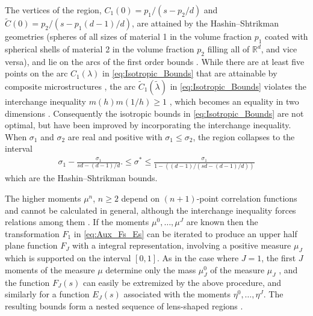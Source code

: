 \documentclass[11pt]{amsart}
\begin{document}
The vertices of the region,
$C_1(0)=p_1/(s-p_2/d)$ and $\tilde{C}(0)=p_2/(s-p_1(d-1)/d)$, are
attained by the Hashin--Shtrikman geometries (spheres of all
sizes of material 1 in the volume fraction $p_1$ coated with spherical
shells of material 2 in the volume fraction $p_2$ filling all of
$\mathbb{R}^d$, and vice versa), and lie on the arcs of the first
order bounds \cite{Golden:1986:BCP}. While there are at least five
points on the arc $C_1(\lambda)$ in \eqref{eq:Isotropic_Bounds} that are
attainable by composite microstructures \cite{Milton:JAP-5286}, the
arc $\tilde{C}_1(\tilde{\lambda})$ in \eqref{eq:Isotropic_Bounds} violates
\cite{Golden:1986:BCP} the interchange inequality $m(h)m(1/h)\geq1$
\cite{Keller:1964:TCC,Schulgasser:1976:CFR}, which becomes an equality
in two dimensions \cite{MILTON:2002:TC}.  Consequently the isotropic
bounds in \eqref{eq:Isotropic_Bounds} are not optimal, but have been
improved \cite{Milton:APL-300,Bergman:AP-78} by incorporating the
interchange inequality. When $\sigma_1$ and $\sigma_2$ are real and positive
with $\sigma_1\leq\sigma_2$, the region collapses to the interval
%
\begin{align}
  \sigma_1-\frac{\sigma_1}{sd-(d-1)/d}.
  \leq\sigma^*\leq 
  \frac{\sigma_1}{1-((d-1)/(sd-(d-1)/d))}
\end{align}
%
which are the Hashin--Shtrikman bounds.




The higher moments $\mu^n$, $n\geq2$ depend on $(n+1)$-point correlation
functions \cite{Golden:CMP-473} and cannot be calculated in general,
although the interchange inequality forces relations among them
\cite{Milton:JAP-5294}. If the moments $\mu^0,\ldots,\mu^J$ are known then the
transformation $F_1$ in \eqref{eq:Aux_Fs_Es} can be iterated to
produce an upper half plane function $F_J$ with a integral
representation, involving a positive measure $\mu_J$ which is supported
on the interval $[0,1]$. As in the case where $J=1$, the first $J$
moments of the measure $\mu$ determine only the mass $\mu_J^0$ of the
measure $\mu_J$ \cite{Golden:1986:BCP}, and the function $F_J(s)$ can
easily be extremized by the above procedure, and similarly for a
function $E_J(s)$ associated with the moments $\eta^0,\ldots,\eta^J$. The
resulting bounds form a nested sequence of lens-shaped regions
\cite{Golden:1986:BCP}.
\end{document}
